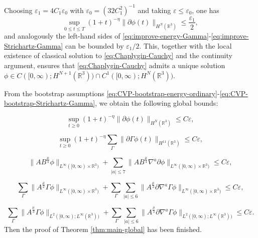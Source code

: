 \documentclass[11pt,twoside]{article}
\theoremstyle{plain}
\theoremstyle{definition}
\theoremstyle{assumption}
\numberwithin{equation}{section}
\begin{document}
	Choosing \(\varepsilon_1 = 4C_1\varepsilon_0\) with
	\(\varepsilon_0 = (32C_1^2)^{-1}\) and taking
	\(\varepsilon\le\varepsilon_0\), one has
	\[
	\sup_{0\le t\le T}(1+t)^{-\eta}\|\partial\phi(t)\|_{H^N(\mathbb R^3)}
	\le \frac{\varepsilon_1}{2},
	\]
	and analogously the left-hand sides of
	\eqref{eq:improve-energy-Gamma}-\eqref{eq:improve-Strichartz-Gamma}
	can be bounded by \(\varepsilon_1/2\).
	This, together with the local existence of classical solution to
	\eqref{eq:Chaplygin-Cauchy} and the continuity argument, ensures that
	\eqref{eq:Chaplygin-Cauchy} admits a unique solution
	\(\phi\in C([0,\infty);H^{N+1}(\mathbb R^3))\cap C^1([0,\infty);H^{N}(\mathbb R^3))\).
	
	
	From the bootstrap assumptions
	\eqref{eq:CVP-bootstrap-energy-ordinary}-\eqref{eq:CVP-bootstrap-Strichartz-Gamma}, we obtain the following global bounds:
	
	\begin{equation}
		\sup_{t\ge 0}(1+t)^{-\eta}\|\partial\phi(t)\|_{H^N(\mathbb R^3)}
		\le C\varepsilon,
		\label{eq:global-energy-ordinary}
	\end{equation}
	
	\begin{equation}
		\sup_{t\ge 0}(1+t)^{-\eta}\sum_{\Gamma}\|\partial\Gamma\phi(t)\|_{H^{11}(\mathbb R^3)}
		\le C\varepsilon,
		\label{eq:global-energy-Gamma}
	\end{equation}
	
	\begin{equation}
		\bigl\|AB^{\frac{\mu}{4}}\phi\bigr\|_{L^\infty([0,\infty)\times\mathbb R^3)}
		+\sum_{|a|\le 7}\bigl\|AB^{\frac{\mu}{4}}\nabla^a\partial\phi\bigr\|_{L^\infty([0,\infty)\times\mathbb R^3)}
		\le C\varepsilon,
		\label{eq:global-pointwise-phi}
	\end{equation}
	
	\begin{equation}
		\sum_{\Gamma}\bigl\|A^{\frac{\mu}{2}}\Gamma\phi\bigr\|_{L^\infty([0,\infty)\times\mathbb R^3)}
		+\sum_{\Gamma}\sum_{|a|\le 6}\bigl\|A^{\frac{\mu}{2}}\partial\nabla^a\Gamma\phi\bigr\|_{L^\infty([0,\infty)\times\mathbb R^3)}
		\le C\varepsilon,
		\label{eq:global-pointwise-Gamma}
	\end{equation}
	
	\begin{equation}
		\sum_{\Gamma}\bigl\|A^{\frac{\mu}{3}}\Gamma\phi\bigr\|_{L^2([0,\infty);L^\infty(\mathbb R^3))}
		+\sum_{\Gamma}\sum_{|a|\le 6}\bigl\|A^{\frac{\mu}{3}}\partial\nabla^a\Gamma\phi\bigr\|_{L^2([0,\infty);L^\infty(\mathbb R^3))}
		\le C\varepsilon.
		\label{eq:global-Strichartz-Gamma}
	\end{equation}
	Then the proof of
		Theorem \ref{thm:main-global} has been finished.
	
\end{document}
